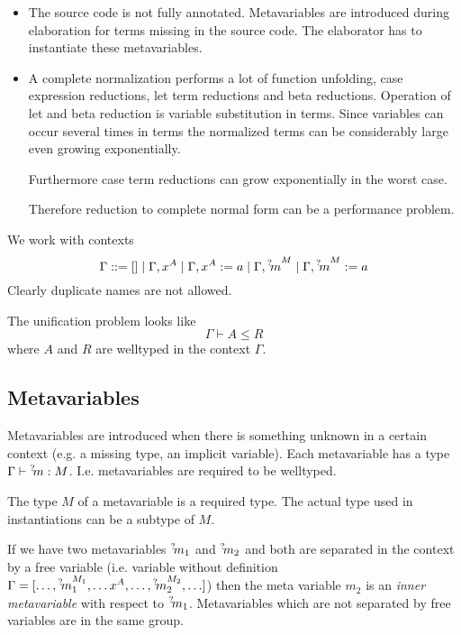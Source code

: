 \begin{itemize}

    \item The source code is not fully annotated. Metavariables are introduced
        during elaboration for terms missing in the source code. The elaborator
        has to instantiate these metavariables.

    \item A complete normalization performs a lot of function unfolding, case
        expression reductions, let term reductions and beta reductions.
        Operation of let and beta reduction is variable substitution in terms.
        Since variables can occur several times in terms the normalized terms
        can be considerably large even growing exponentially.

        Furthermore case term reductions can grow exponentially in the worst
        case.

        Therefore reduction to complete normal form can be a performance
        problem.
\end{itemize}


We work with contexts
$$
    \Gamma ::= [] \mid \Gamma,x^A \mid \Gamma, x^A := a \mid \Gamma, {{}^? \kern-0.2em m}^M
                \mid \Gamma, {{}^? \kern-0.2em m}^M := a
$$
Clearly duplicate names are not allowed.

The unification problem looks like
$$
\Gamma \vdash A \le R
$$
where $A$ and $R$ are welltyped in the context $\Gamma$.





\subsection{Metavariables}


Metavariables are introduced when there is something unknown in a certain
context (e.g. a missing type, an implicit variable). Each metavariable has a
type $\Gamma \vdash {{}^? \kern-0.2em m} : M$. I.e. metavariables are required to be
welltyped.

The type $M$ of a metavariable is a required type. The actual type used in
instantiations can be a subtype of $M$.

If we have two metavariables ${{}^? \kern-0.2em m}_1$ and ${{}^? \kern-0.2em m}_2$ and both are separated
in the context by a free variable (i.e. variable without definition $\Gamma = [
    \ldots, {{}^? \kern-0.2em m}_1^{M_1}, \ldots x^A, \ldots, {{}^? \kern-0.2em m}_2^{M_2}, \ldots]$) then
the meta variable $m_2$ is an \emph{inner metavariable} with respect to ${{}^? \kern-0.2em m}_1$. Metavariables which are not separated by free variables are in the same
group.


